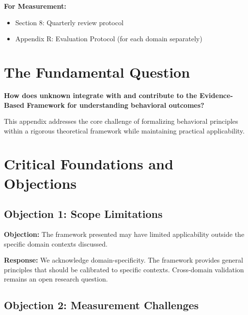 \textbf{For Measurement:}
\begin{itemize}[nosep]
\item Section 8: Quarterly review protocol
\item Appendix R: Evaluation Protocol (for each domain separately)
\end{itemize}



\section{The Fundamental Question}
\label{sec:mmm-fundamental}

\begin{tcolorbox}[
    colback=red!5!white,
    colframe=red!75!black,
    title={\textbf{Fundamental Question}}
]
\textbf{How does unknown integrate with and contribute to the
Evidence-Based Framework for understanding behavioral outcomes?}

This appendix addresses the core challenge of formalizing behavioral principles
within a rigorous theoretical framework while maintaining practical applicability.
\end{tcolorbox}


\section{Critical Foundations and Objections}
\label{sec:mmm-foundations}

\subsection{Objection 1: Scope Limitations}

\textbf{Objection:} The framework presented may have limited applicability
outside the specific domain contexts discussed.

\textbf{Response:} We acknowledge domain-specificity. The framework provides
general principles that should be calibrated to specific contexts. Cross-domain
validation remains an open research question.

\subsection{Objection 2: Measurement Challenges}


